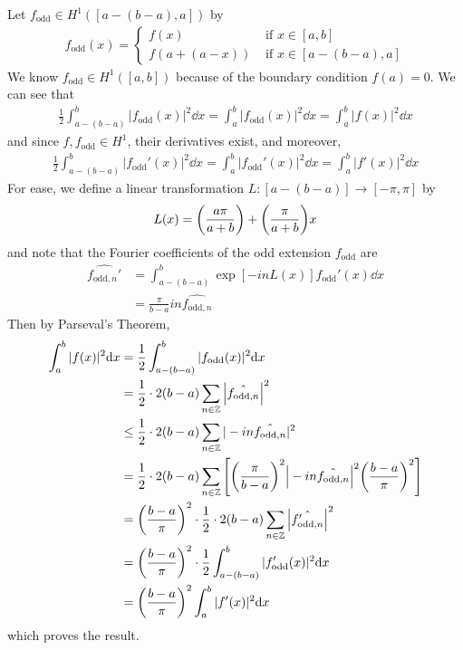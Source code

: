\documentclass[paper=a4, fontsize=11pt]{scrartcl} %
\theoremstyle{plain}
\numberwithin{equation}{section} %
\numberwithin{figure}{section} %
\numberwithin{table}{section} %
\begin{document}
Let $f_\text{odd} \in H^1([a-(b-a),a])$ by
\begin{align*}
    f_\text{odd}(x) = \begin{cases}
        f(x) & \text{ if } x \in [a,b] \\
        f(a + (a-x)) & \text{ if } x \in [a - (b-a), a]
    \end{cases}
\end{align*}
We know $f_\text{odd} \in H^1([a, b])$ because of the boundary condition $f(a) = 0$.  We can see that
\begin{align*}
    \frac{1}{2}\int_{a - (b-a)}^b |f_\text{odd}(x)|^2 \dd x = \int_a^b |f_\text{odd}(x)|^2 \dd x = \int_a^b |f(x)|^2 \dd x
\end{align*}
and since $f, f_\text{odd} \in H^1$, their derivatives exist, and moreover,
\begin{align*}
    \frac{1}{2}\int_{a - (b-a)}^b |f_\text{odd}'(x)|^2 \dd x = \int_a^b |f_\text{odd}'(x)|^2 \dd x = \int_a^b |f'(x)|^2 \dd x
\end{align*}
For ease, we define a linear transformation $L:[a - (b-a)] \rightarrow [-\pi, \pi]$ by
\begin{align*}
    L(x) = \qty(\frac{a\pi}{a+b}) + \qty(\frac{\pi}{a+b})x
\end{align*}
and note that the Fourier coefficients of the odd extension $f_\text{odd}$ are
\begin{align*}
    \hat{f_{\text{odd},n}'} &= \int_{a - (b-a)}^b \exp[-in L(x)]f_\text{odd}'(x)\dd x \\
    &= \frac{\pi}{b-a}in\hat{f_{\text{odd},n}}
\end{align*}
Then by Parseval's Theorem,
\begin{align*}
    \int_a^b|f(x)|^2\dd x &= \frac{1}{2}\int_{a-(b-a)}^b |f_\text{odd}(x)|^2\dd x\\
    &= \frac{1}{2}\cdot 2(b-a)\sum_{n\in\mathbb{Z}}\left|\hat{f_{\text{odd},n}}\right|^2 \\
    &\leq \frac{1}{2}\cdot 2(b-a)\sum_{n\in\mathbb{Z}}|-in\hat{f_{\text{odd},n}}|^2 \\
    &= \frac{1}{2}\cdot 2(b-a)\sum_{n\in\mathbb{Z}}\qty[\qty(\frac{\pi}{b-a})^2\Big|-in\hat{f_{\text{odd},n}}\Big|^2\qty(\frac{b-a}{\pi})^2] \\
    &= \qty(\frac{b-a}{\pi})^2\cdot \frac{1}{2}\cdot 2(b-a)\sum_{n\in\mathbb{Z}}\Big|\hat{f_{\text{odd},n}'}\Big|^2 \\
    &= \qty(\frac{b-a}{\pi})^2\cdot\frac{1}{2}\int_{a-(b-a)}^b|f_\text{odd}'(x)|^2\dd x \\
    &= \qty(\frac{b-a}{\pi})^2\int_a^b|f'(x)|^2\dd x
\end{align*}
which proves the result.
\end{document}

